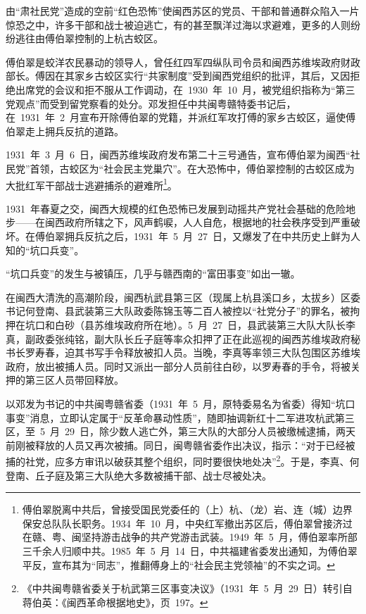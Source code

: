 由“肃社民党”造成的空前“红色恐怖”使闽西苏区的党员、干部和普通群众陷入一片惊恐之中，许多干部和战士被迫逃亡，有的甚至飘洋过海以求避难，更多的人则纷纷逃往由傅伯翠控制的上杭古蛟区。

傅伯翠是蛟洋农民暴动的领导人，曾任红四军四纵队司令员和闽西苏维埃政府财政部长。傅因在其家乡古蛟区实行“共家制度”受到闽西党组织的批评，其后，又因拒绝出席党的会议和拒不服从工作调动，在~1930~年~10~月，被党组织指称为“第三党观点”而受到留党察看的处分。邓发担任中共闽粤赣特委书记后，在~1931~年~2~月宣布开除傅伯翠的党籍，并派红军攻打傅的家乡古蛟区，逼使傅伯翠走上拥兵反抗的道路。

1931~年~3~月~6~日，闽西苏维埃政府发布第二十三号通告，宣布傅伯翠为闽西“社民党”首领，古蛟区为“社会民主党巢穴”。在大恐怖中，傅伯翠控制的古蛟区成为大批红军干部战士逃避捕杀的避难所\footnote{傅伯翠脱离中共后，曾接受国民党委任的（上）杭、（龙）岩、连（城）边界保安总队队长职务。1934~年~10~月，中央红军撤出苏区后，傅伯翠曾接济过在赣、粤、闽坚持游击战争的共产党游击武装。1949~年~5~月，傅伯翠率所部三千余人归顺中共。1985~年~5~月~14~日，中共福建省委发出通知，为傅伯翠平反，宣布其为“同志”，推翻傅身上的“社会民主党领袖”的不实之词。}。

1931~年春夏之交，闽西大规模的红色恐怖已发展到动摇共产党社会基础的危险地步——在闽西政府所辖之下，风声鹤唳，人人自危，根据地的社会秩序受到严重破坏。在傅伯翠拥兵反抗之后，1931~年~5~月~27~日，又爆发了在中共历史上鲜为人知的“坑口兵变”。

“坑口兵变”的发生与被镇压，几乎与赣西南的“富田事变”如出一辙。

在闽西大清洗的高潮阶段，闽西杭武县第三区（现属上杭县溪口乡，太拔乡）区委书记何登南、县武装第三大队政委陈锦玉等二百人被控以“社党分子”的罪名，被拘押在坑口和白砂（县苏维埃政府所在地）。5~月~27~日，县武装第三大队大队长李真，副政委张纯铭，副大队长丘子庭等率众扣押了正在此巡视的闽西苏维埃政府秘书长罗寿春，迫其书写手令释放被扣人员。当晚，李真等率领三大队包围区苏维埃政府，放出被捕人员。同时又派出一部分人员前往白砂，以罗寿春的手令，将被关押的第三区人员带回释放。

以邓发为书记的中共闽粤赣省委（1931~年~5~月，原特委易名为省委）得知“坑口事变”消息，立即认定属于“反革命暴动性质”，随即抽调新红十二军进攻杭武第三区，至~5~月~29~日，除少数人逃亡外，第三大队的大部分人员被缴械逮捕，两天前刚被释放的人员又再次被捕。同日，闽粤赣省委作出决议，指示：“对于已经被捕的社党，应多方审讯以破获其整个组织，同时要很快地处决”\footnote{《中共闽粤赣省委关于杭武第三区事变决议》（1931~年~5~月~29~日）转引自蒋伯英：《闽西革命根据地史》，页~197。}。于是，李真、何登南、丘子庭及第三大队绝大多数被捕干部、战士尽被处决。


